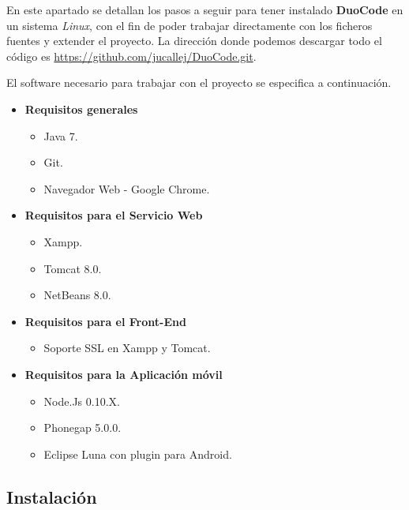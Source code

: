 En este apartado se detallan los pasos a seguir para tener instalado \textbf{DuoCode} en un sistema \textit{Linux}, con el fin de poder trabajar directamente con los ficheros fuentes y extender el proyecto. La dirección donde podemos descargar todo el código es \url{https://github.com/jucallej/DuoCode.git}.

El software necesario para trabajar con el proyecto se especifica a continuación.

\begin{itemize}
\item \textbf{Requisitos generales}
\begin{itemize}
\item Java 7.
\item Git.
\item Navegador Web - Google Chrome.
\end{itemize}
\end{itemize}
\begin{itemize}
\item \textbf{Requisitos para el Servicio Web}
\begin{itemize}
\item Xampp.
\item Tomcat 8.0.
\item NetBeans 8.0.
\end{itemize}
\end{itemize}
\begin{itemize}
\item \textbf{Requisitos para el Front-End}

\begin{itemize}
\item Soporte SSL en Xampp y Tomcat.
\end{itemize}
\end{itemize}
\begin{itemize}
\item \textbf{Requisitos para la Aplicación móvil}
\begin{itemize}
\item Node.Js 0.10.X.
\item Phonegap 5.0.0.
\item Eclipse Luna con plugin para Android.
\end{itemize}
\end{itemize}

\subsection{Instalación}

